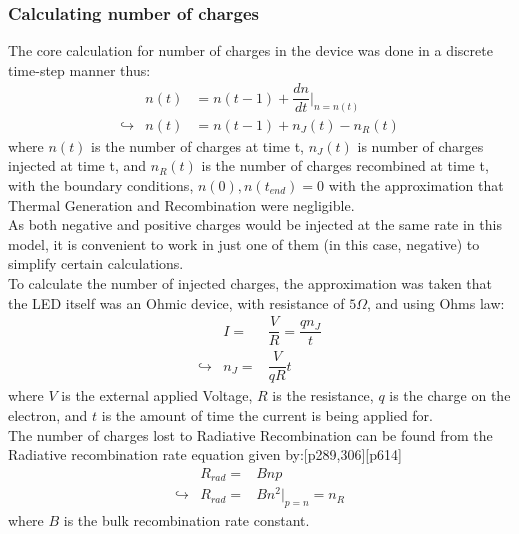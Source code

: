 \documentclass[titlepage]{article}
\begin{document}
\subsubsection{Calculating number of charges}
The core calculation for number of charges in the device was done in a discrete time-step manner thus:
\begin{eqnarray}
&n(t) &= n(t-1) + \dfrac{dn}{dt}\Big|_{n=n(t)} \\
\hookrightarrow &n(t) &= n(t-1) + n_J(t) - n_R(t) 
\end{eqnarray}
where $n(t)$ is the number of charges at time t, $n_J(t)$ is number of charges injected at time t, and $n_R(t)$ is the number of charges recombined at time t, with the boundary conditions, $n(0), n(t_{end}) = 0$ with the approximation that Thermal Generation and Recombination were negligible.\\
As both negative and positive charges would be injected at the same rate in this model, it is convenient to work in just one of them (in this case, negative) to simplify certain calculations.\\
To calculate the number of injected charges, the approximation was taken that the LED itself was an Ohmic device, with resistance of $5\Omega$, and using Ohms law:
\begin{eqnarray}
	&I =& \dfrac{V}{R} =  \dfrac{q n_J}{t}\\
\hookrightarrow	&n_J =& \dfrac{V}{qR}t
\end{eqnarray}
where $V$ is the external applied Voltage, $R$ is the resistance, $q$ is the charge on the electron, and $t$ is the amount of time the current is being applied for.\\
The number of charges lost to Radiative Recombination can be found from the  Radiative recombination rate equation given by:\cite{NSD}[p289,306]\cite{Sze}[p614]
\begin{eqnarray}
&R_{rad} =& Bnp\\
\hookrightarrow &R_{rad} =& Bn^2\Big|_{p=n} = n_R 
\end{eqnarray}
where $B$ is the bulk recombination rate constant.\\
\end{document}
